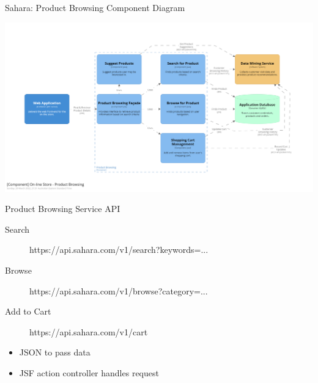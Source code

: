 \documentclass{slide}
\begin{document}
\begin{frame}{Sahara: Product Browsing Component Diagram}
    \vspace{2mm}    
    \begin{adjustwidth}{-10mm}{-10mm}
        \centering
        \includegraphics[trim=190 199 230 200,clip,width=0.97\paperwidth]{diagrams/sahara-component-browse.png}
    \end{adjustwidth}
\end{frame}

\begin{frame}{Product Browsing Service API}
    \vspace{1mm}
    {\LARGE
    \begin{description}
        \item[Search] https://api.sahara.com/v1/search?keywords=...
        \item[Browse] https://api.sahara.com/v1/browse?category=...
        \item[Add to Cart] https://api.sahara.com/v1/cart
    \end{description}
    \vspace{4mm}
    \begin{itemize}
        \item JSON to pass data
        \item JSF action controller handles request
    \end{itemize}
    }
\end{frame}
\end{document}
